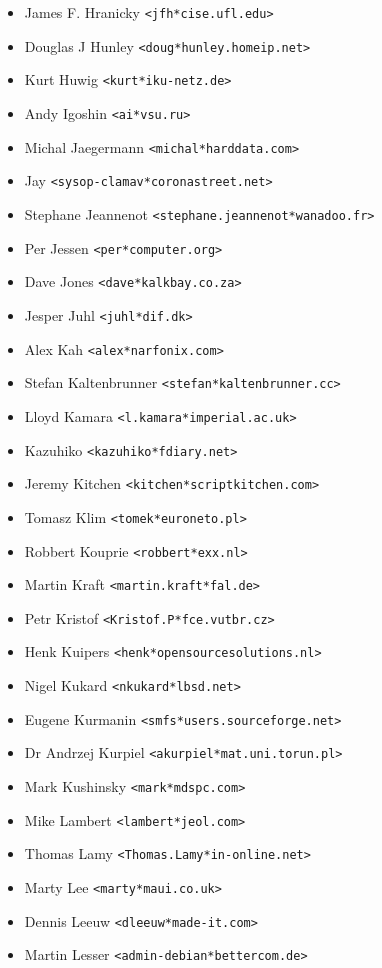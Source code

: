\documentclass[a4paper,titlepage,12pt]{article}
\newcommand{\email}[1]{\texttt{#1}}
\begin{document}
\begin{itemize}
	\item James F.  Hranicky \email{<jfh*cise.ufl.edu>}
	\item Douglas J Hunley \email{<doug*hunley.homeip.net>}
	\item Kurt Huwig \email{<kurt*iku-netz.de>}
	\item Andy Igoshin \email{<ai*vsu.ru>}
	\item Michal Jaegermann \email{<michal*harddata.com>}
	\item Jay \email{<sysop-clamav*coronastreet.net>}
	\item Stephane Jeannenot \email{<stephane.jeannenot*wanadoo.fr>}
	\item Per Jessen \email{<per*computer.org>}
	\item Dave Jones \email{<dave*kalkbay.co.za>}
	\item Jesper Juhl \email{<juhl*dif.dk>}
	\item Alex Kah \email{<alex*narfonix.com>}
	\item Stefan Kaltenbrunner \email{<stefan*kaltenbrunner.cc>}
	\item Lloyd Kamara \email{<l.kamara*imperial.ac.uk>}
	\item Kazuhiko \email{<kazuhiko*fdiary.net>}
	\item Jeremy Kitchen \email{<kitchen*scriptkitchen.com>}
	\item Tomasz Klim \email{<tomek*euroneto.pl>}
	\item Robbert Kouprie \email{<robbert*exx.nl>}
	\item Martin Kraft \email{<martin.kraft*fal.de>}
	\item Petr Kristof \email{<Kristof.P*fce.vutbr.cz>}
	\item Henk Kuipers \email{<henk*opensourcesolutions.nl>}
	\item Nigel Kukard \email{<nkukard*lbsd.net>}
	\item Eugene Kurmanin \email{<smfs*users.sourceforge.net>}
	\item Dr Andrzej Kurpiel \email{<akurpiel*mat.uni.torun.pl>}
	\item Mark Kushinsky \email{<mark*mdspc.com>}
	\item Mike Lambert \email{<lambert*jeol.com>}
	\item Thomas Lamy \email{<Thomas.Lamy*in-online.net>}
	\item Marty Lee \email{<marty*maui.co.uk>}
	\item Dennis Leeuw \email{<dleeuw*made-it.com>}
	\item Martin Lesser \email{<admin-debian*bettercom.de>}

\end{itemize}
\end{document}
